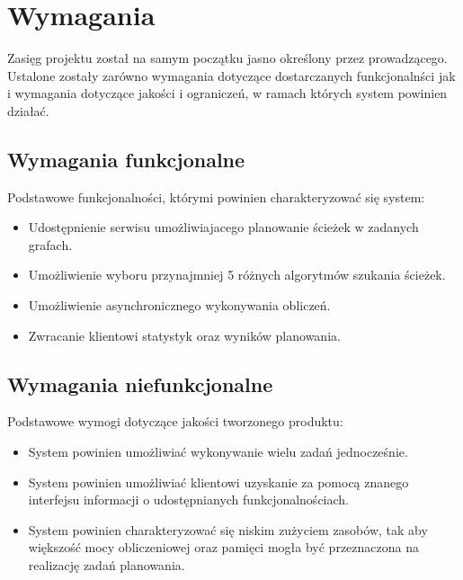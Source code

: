 \chapter{Wymagania}

Zasięg projektu został na samym początku jasno określony przez prowadzącego.
Ustalone zostały zarówno wymagania dotyczące dostarczanych funkcjonalnści jak i wymagania dotyczące jakości i ograniczeń, w ramach których system powinien działać.

\section{Wymagania funkcjonalne}

Podstawowe funkcjonalności, którymi powinien charakteryzować się system:

\begin{itemize}
	\item Udostępnienie serwisu umożliwiajacego planowanie ścieżek w zadanych grafach.
	\item Umożliwienie wyboru przynajmniej 5 różnych algorytmów szukania ścieżek.
	\item Umożliwienie asynchronicznego wykonywania obliczeń.
	\item Zwracanie klientowi statystyk oraz wyników planowania.
\end{itemize}

\section{Wymagania niefunkcjonalne}

Podstawowe wymogi dotyczące jakości tworzonego produktu:

\begin{itemize}
	\item System powinien umożliwiać wykonywanie wielu zadań jednocześnie.
	\item System powinien umożliwiać klientowi uzyskanie za pomocą znanego interfejsu informacji o udostępnianych funkcjonalnościach.
	\item System powinien charakteryzować się niskim zużyciem zasobów, tak aby większość mocy obliczeniowej oraz pamięci mogła być przeznaczona na realizację zadań planowania.
\end{itemize}